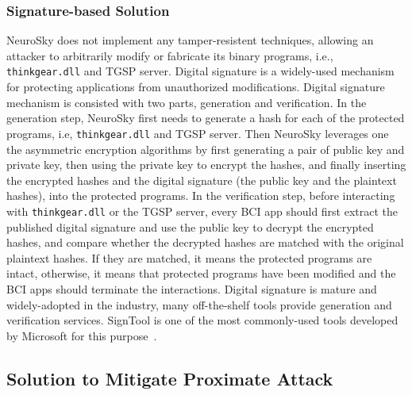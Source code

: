 \subsubsection{Signature-based Solution}
NeuroSky does not implement any tamper-resistent techniques, allowing an attacker to arbitrarily modify or fabricate its binary programs, i.e., \texttt{thinkgear.dll} and TGSP server. Digital signature is a widely-used mechanism for protecting applications from unauthorized modifications. Digital signature mechanism is consisted with two parts, generation and verification. In the generation step, NeuroSky first needs to generate a hash for each of the protected programs, i.e, \texttt{thinkgear.dll} and TGSP server. Then NeuroSky leverages one the asymmetric encryption algorithms by first generating a pair of public key and private key, then using the private key to encrypt the hashes, and finally inserting the encrypted hashes and the digital signature (the public key and the plaintext hashes), into the protected programs. In the verification step, before interacting with \texttt{thinkgear.dll} or the TGSP server, every BCI app should first extract the published digital signature and use the public key to decrypt the encrypted hashes, and compare whether the decrypted hashes are matched with the original plaintext hashes. If they are matched, it means the protected programs are intact, otherwise, it means that protected programs have been modified and the BCI apps should terminate the interactions. Digital signature is mature and widely-adopted in the industry, many off-the-shelf tools provide generation and verification services. SignTool is one of the most commonly-used tools developed by Microsoft for this purpose~\cite{signtool}.

\subsection{Solution to Mitigate Proximate Attack}

